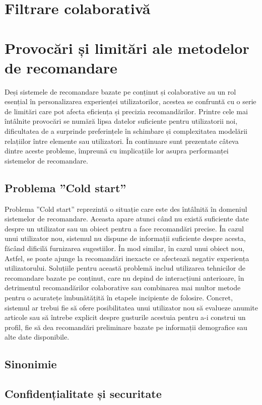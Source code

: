\section{Filtrare colaborativă}
\label{sec:ch3sec2}
\section{Provocări și limitări ale metodelor de recomandare}
\label{sec:ch3sec3}
Deși sistemele de recomandare bazate pe conținut și colaborative au un rol esențial în personalizarea experienței utilizatorilor, acestea se confruntă cu o serie de limitări care pot afecta eficiența și precizia recomandărilor. 
Printre cele mai întâlnite provocări se numără lipsa datelor suficiente pentru utilizatorii noi, dificultatea de a surprinde preferințele în schimbare și complexitatea modelării relațiilor între elemente sau utilizatori. 
În continuare sunt prezentate câteva dintre aceste probleme, împreună cu implicațiile lor asupra performanței sistemelor de recomandare.

\subsection{Problema ”Cold start”}
\label{subsec:ch3sec3sub1}
Problema ”Cold start” reprezintă o situație care este des întâlnită în domeniul sistemelor de recomandare. 
Aceasta apare atunci când nu există suficiente date despre un utilizator sau un obiect pentru a face recomandări precise.
În cazul unui utilizator nou, sistemul nu dispune de informații suficiente despre acesta, făcând dificilă furnizarea sugestiilor.
În mod similar, în cazul unui obiect nou, 
Astfel, se poate ajunge la recomandări inexacte ce afectează negativ experiența utilizatorului.
Soluțiile pentru această problemă includ utilizarea tehnicilor de recomandare bazate pe conținut, care nu depind de interacțiuni anterioare, 
în detrimentul recomandărilor colaborative sau combinarea mai multor metode pentru o acuratețe îmbunătățită în etapele incipiente de folosire.
Concret, sistemul ar trebui fie să ofere posibilitatea unui utilizator nou să evalueze anumite articole sau să întrebe explicit despre gusturile acestuia pentru a-i construi un profil, 
fie să dea recomandări preliminare bazate pe informații demografice sau alte date disponibile.
\cite{kumar2018recommendation}


\subsection{Sinonimie}
\label{subsec:ch3sec3sub2}

\subsection{Confidențialitate și securitate}
\label{subsec:ch3sec3sub3}